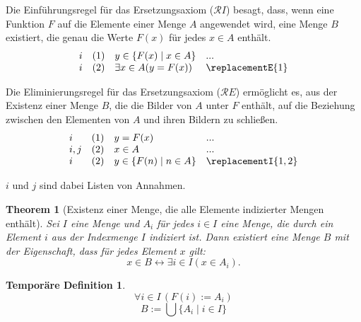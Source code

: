 \documentclass{book}
\theoremstyle{plain}
\newtheorem{theorem}{Theorem}
\theoremstyle{remark}
\theoremstyle{definition}
\newtheorem*{tempdefinition}{Temporäre Definition}
\begin{document}
Die Einführungsregel für das Ersetzungsaxiom (\(\mathcal{R}I\)) besagt, dass, wenn eine Funktion \( F \) auf die Elemente einer Menge \( A \) angewendet wird, eine Menge \( B \) existiert, die genau die Werte \( F(x) \) für jedes \( x \in A \) enthält.
\[
\begin{array}{llll}
	i & (1) & y\in \{F(x)\mid x\in A\} & ... \\
	i & (2) & \exists x\in A(y = F(x)) & \replacementE{1} \\
\end{array}
\]

Die Eliminierungsregel für das Ersetzungsaxiom (\(\mathcal{R}E\)) ermöglicht es, aus der Existenz einer Menge \( B \), die die Bilder von \( A \) unter \( F \) enthält, auf die Beziehung zwischen den Elementen von \( A \) und ihren Bildern zu schließen.
\[
\begin{array}{llll}
	i & (1) & y=F(x) & ... \\
        i,j & (2) & x\in A & ... \\
	i & (2) & y\in \{F(n)\mid n\in A\} & \replacementI{1,2} \\
\end{array}
\]

\(i\) und \(j\) sind dabei Listen von Annahmen.

\label{xInBLrExiInILpxInASubiRp}
\begin{theorem}[Existenz einer Menge, die alle Elemente indizierter Mengen enthält]
    Sei \( I \) eine Menge und \( A_i \) für jedes \( i \in I \) eine Menge, die durch ein Element \( i \) aus der Indexmenge \( I \) indiziert ist. Dann existiert eine Menge \( B \) mit der Eigenschaft, dass für jedes Element \( x \) gilt:
    \[
    x \in B \leftrightarrow \exists i \in I(x \in A_i).
    \]
\end{theorem}

\begin{tempdefinition}
    \[
    \forall i \in I \, (F(i) := A_i)
    \]
    \[
    B := \bigcup \{ A_i \mid i \in I \}
    \]
\end{tempdefinition}
\end{document}
